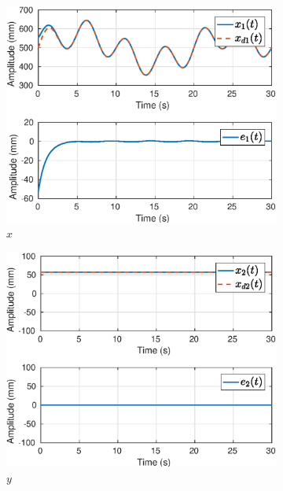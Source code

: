 \begin{figure}[H]
\centering
\begin{subfigure}{.5\textwidth}
  \centering
  \includegraphics[width=\linewidth]{./img/simul_delay_zoh1/x1.eps}
  \caption{$x$}
  \label{fig:simul_traj1_x1}
\end{subfigure}%
\begin{subfigure}{.5\textwidth}
  \centering
  \includegraphics[width=\linewidth]{./img/simul_delay_zoh1/x2.eps}
  \caption{$y$}
  \label{fig:simul_traj1_x2}
\end{subfigure}
\begin{subfigure}{.5\textwidth}

\end{subfigure}
\end{figure}
